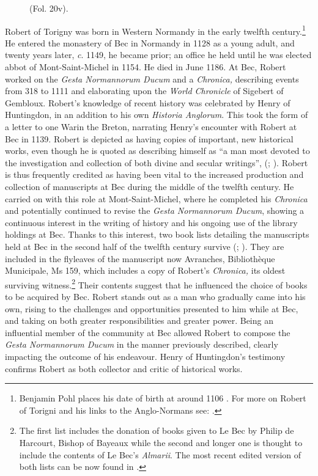 \begin{paper}
\begin{figure}[H]
  \centering
    \caption{(Fol. 20v).}
    \label{fig:escobar4}
  \end{figure}
  
Robert of Torigny was born in Western Normandy in the early twelfth
century.\footnote{Benjamin Pohl places his date of birth at around 1106 
  \citep[112]{pohl_robert_2018}. For more on Robert of Torigni and his links to the
  Anglo-Normans see: \cite{bates_robert_2012}.} He entered the monastery of Bec in
Normandy in 1128 as a young adult, and twenty years later, \emph{c}.
1149, he became prior; an office he held until he was elected
abbot of Mont-Saint-Michel in 1154. He died in June 1186. At Bec, Robert worked
on the \emph{Gesta Normannorum Ducum} and a \emph{Chronica,} describing
events from 318 to 1111 and elaborating upon the \emph{World Chronicle}
of Sigebert of Gembloux. Robert's knowledge of recent history was
celebrated by Henry of Huntingdon, in an addition to his own
\emph{Historia Anglorum}. This took the form of a letter to one Warin
the Breton, narrating Henry's encounter with Robert at Bec in 1139.
Robert is depicted as having copies of important, new historical works,
even though he is quoted as describing himself as ``a man most devoted to
the investigation and collection of both divine and secular writings'',
(\cite[lxxviii]{van_houts_gesta_1992}; \cite[98]{pohl_robert_2018}). Robert is thus frequently
credited as having been vital to the increased production and collection
of manuscripts at Bec during the middle of the twelfth century. He
carried on with this role at Mont-Saint-Michel, where he completed his
\emph{Chronica} and potentially continued to revise the \emph{Gesta
Normannorum Ducum}, showing a continuous interest in the writing of
history and his ongoing use of the library holdings at Bec. Thanks to
this interest, two book lists detailing the manuscripts held at Bec in
the second half of the twelfth century survive (\cite{pohl_monastic_2017}; \cite[51]{pohl_abbas_2014}). They are included in the flyleaves of the manuscript now Avranches,
Bibliothèque Municipale, Ms 159, which includes a copy of Robert's
\emph{Chronica,} its oldest surviving witness.\footnote{The first list
  includes the donation of books given to Le Bec by Philip de Harcourt,
  Bishop of Bayeaux while the second and longer one is thought to
  include the contents of Le Bec's \emph{Almarii}. The most recent
  edited version of both lists can be now found in \cite{pohl_monastic_2017}.}
Their contents suggest that he influenced the choice of books to be
acquired by Bec. Robert stands out as a man who gradually came into his
own, rising to the challenges and opportunities presented to him while
at Bec, and taking on both greater responsibilities and greater power.
Being an influential member of the community at Bec allowed Robert to
compose the \emph{Gesta Normannorum Ducum} in the manner previously
described, clearly impacting the outcome of his endeavour. Henry of
Huntingdon's testimony confirms Robert as both collector and critic of
historical works.


\end{paper}
